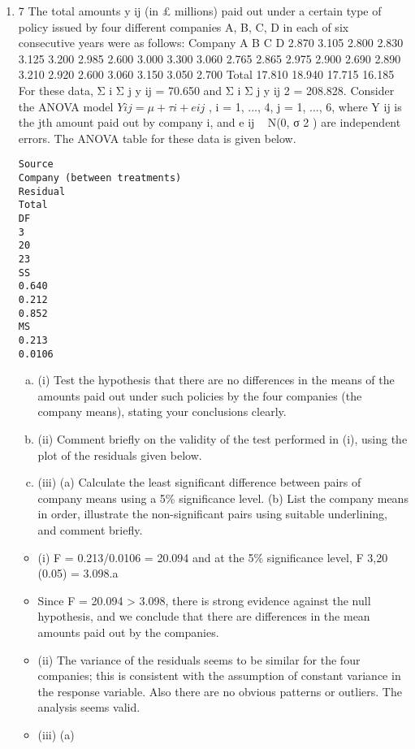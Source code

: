 \documentclass[a4paper,12pt]{article}
\begin{document}
\begin{enumerate}
\item
7
The total amounts y ij (in £ millions) paid out under a certain type of policy issued by four different companies A, B, C, D in each of six consecutive years were as follows:
Company
A
B
C
D
2.870
3.105
2.800
2.830
3.125
3.200
2.985
2.600
3.000
3.300
3.060
2.765
2.865
2.975
2.900
2.690
2.890
3.210
2.920
2.600
3.060
3.150
3.050
2.700
Total
17.810
18.940
17.715
16.185
For these data, Σ i Σ j y ij = 70.650 and Σ i Σ j y ij 2 = 208.828.
Consider the ANOVA model $Y ij = \mu + \tau i + e ij$ , i = 1, ..., 4, j = 1, ..., 6, where Y ij is the
jth amount paid out by company i, and e ij ~ N(0, σ 2 ) are independent errors.
The ANOVA table for these data is given below.

\begin{verbatim}
Source
Company (between treatments)
Residual
Total
DF
3
20
23
SS
0.640
0.212
0.852
MS
0.213
0.0106
\end{verbatim}

\begin{enumerate}[(a)]
\item (i) Test the hypothesis that there are no differences in the means of the amounts paid out under such policies by the four companies (the company means), stating your conclusions clearly.
\item 
(ii) Comment briefly on the validity of the test performed in (i), using the plot of the residuals given below.
\item
(iii) (a)
Calculate the least significant difference between pairs of company means using a 5\% significance level.
(b)
List the company means in order, illustrate the non-significant pairs using suitable underlining, and comment briefly.
\end{enumerate}
 \begin{itemize}
     \item 

(i) F = 0.213/0.0106 = 20.094 and at the 5\% significance level,
F 3,20 (0.05) = 3.098.a
\item Since F = 20.094 > 3.098, there is strong evidence against the null hypothesis, and we conclude that there are differences in the mean amounts paid out by the companies.
\item (ii) The variance of the residuals seems to be similar for the four companies; this is consistent with the assumption of constant variance in the response variable.
Also there are no obvious patterns or outliers. The analysis seems valid.
\item (iii) (a)




\end{itemize}
\end{enumerate}
\end{document}
